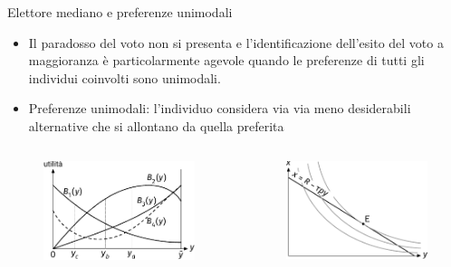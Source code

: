 \documentclass[aspectratio=64,12pt]{beamer}
\begin{document}
\begin{frame}{Elettore mediano e preferenze unimodali}
\begin{itemize}
\item Il paradosso del voto non si presenta e l'identificazione dell'esito del
voto a maggioranza è particolarmente agevole quando le preferenze di tutti gli individui
coinvolti sono \alert{unimodali}.
\item \alert{Preferenze unimodali}: l'individuo considera via via meno desiderabili
alternative che si allontano da quella preferita
\end{itemize}
\begin{columns}
\begin{column}{.5\columnwidth}
\begin{figure}[htbp]
\centering
\includegraphics[width=\textwidth]{./figure/elettore-mediano-1.pdf}
\end{figure}
\end{column}
\begin{column}{.5\columnwidth}
\begin{figure}[htbp]
\centering
\includegraphics[width=\textwidth]{./figure/elettore-mediano-3.pdf}
\end{figure}
\end{column}
\end{columns}
\end{frame}
\end{document}

